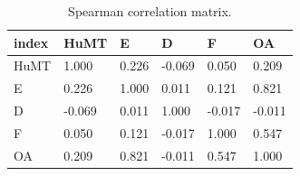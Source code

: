 \begin{table}[t]
\centering
\caption{Spearman correlation matrix.}
\label{tab:corr_spearman}
\begin{tabular}{llllll}
\toprule
index & HuMT & E & D & F & OA \\
\midrule
HuMT & 1.000 & 0.226 & -0.069 & 0.050 & 0.209 \\
E & 0.226 & 1.000 & 0.011 & 0.121 & 0.821 \\
D & -0.069 & 0.011 & 1.000 & -0.017 & -0.011 \\
F & 0.050 & 0.121 & -0.017 & 1.000 & 0.547 \\
OA & 0.209 & 0.821 & -0.011 & 0.547 & 1.000 \\
\bottomrule
\end{tabular}
\end{table}
